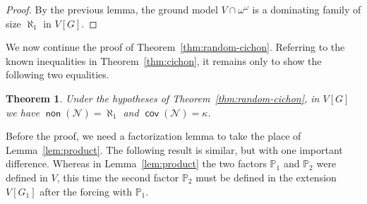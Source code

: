 \documentclass[11pt,oneside]{amsbook}
\newcommand{\PP}{\mathbb P}
\newcommand{\Null}{\mathcal N}
\DeclareMathOperator{\non}{\mathsf{non}}
\DeclareMathOperator{\cov}{\mathsf{cov}}
\theoremstyle{definition}
\theoremstyle{plain}
\newtheorem{theorem}{Theorem}[section]
\newtheorem{lemma}[theorem]{Lemma}
\theoremstyle{definition}
\theoremstyle{remark}
\numberwithin{equation}{section}
\numberwithin{figure}{section}
\begin{document}
\begin{proof}
  By the previous lemma, the ground model $V\cap\omega^\omega$ is a dominating family of size $\aleph_1$ in $V[G]$.
\end{proof}

We now continue the proof of Theorem~\ref{thm:random-cichon}. Referring to the known inequalities in Theorem~\ref{thm:cichon}, it remains only to show the following two equalities.

\begin{theorem}
  \label{thm:random-null}
  Under the hypotheses of Theorem~\ref{thm:random-cichon}, in $V[G]$ we have $\non(\Null)=\aleph_1$ and $\cov(\Null)=\kappa$.
\end{theorem}





Before the proof, we need a factorization lemma to take the place of Lemma~\ref{lem:product}. The following result is similar, but with one important difference. Whereas in Lemma~\ref{lem:product} the two factors $\PP_1$ and $\PP_2$ were defined in $V$, this time the second factor $\PP_2$ must be defined in the extension $V[G_1]$ after the forcing with $\PP_1$.
\end{document}
